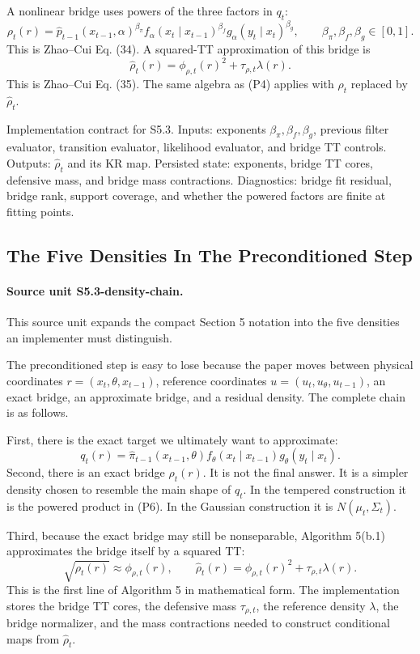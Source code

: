 \documentclass[11pt]{article}
\begin{document}
A nonlinear bridge uses powers of the three factors in \(q_t\):
\[
    \rho_t(r)
    =
    \widehat p_{t-1}(x_{t-1},\alpha)^{\beta_\pi}
    f_\alpha(x_t\mid x_{t-1})^{\beta_f}
    g_\alpha(y_t\mid x_t)^{\beta_g},
    \qquad
    \beta_\pi,\beta_f,\beta_g\in[0,1].
    \tag{P6}
\]
This is Zhao--Cui Eq. (34).  A squared-TT approximation of this bridge is
\[
    \widehat\rho_t(r)
    =
    \phi_{\rho,t}(r)^2+\tau_{\rho,t}\lambda(r).
    \tag{P7}
\]
This is Zhao--Cui Eq. (35).  The same algebra as (P4) applies with
\(\rho_t\) replaced by \(\widehat\rho_t\).

Implementation contract for S5.3.  Inputs: exponents
\(\beta_\pi,\beta_f,\beta_g\), previous filter evaluator, transition evaluator,
likelihood evaluator, and bridge TT controls.  Outputs: \(\widehat\rho_t\) and
its KR map.  Persisted state: exponents, bridge TT cores, defensive mass, and
bridge mass contractions.  Diagnostics: bridge fit residual, bridge rank,
support coverage, and whether the powered factors are finite at fitting points.

\subsection{The Five Densities In The Preconditioned Step}

\paragraph{Source unit S5.3-density-chain.}
This source unit expands the compact Section 5 notation into the five densities
an implementer must distinguish.

The preconditioned step is easy to lose because the paper moves between
physical coordinates \(r=(x_t,\theta,x_{t-1})\), reference coordinates
\(u=(u_t,u_\theta,u_{t-1})\), an exact bridge, an approximate bridge, and a
residual density.  The complete chain is as follows.

First, there is the exact target we ultimately want to approximate:
\[
    q_t(r)
    =
    \widehat\pi_{t-1}(x_{t-1},\theta)
    f_\theta(x_t\mid x_{t-1})
    g_\theta(y_t\mid x_t).
    \tag{P7a}
\]
Second, there is an exact bridge \(\rho_t(r)\).  It is not the final answer.
It is a simpler density chosen to resemble the main shape of \(q_t\).  In the
tempered construction it is the powered product in (P6).  In the Gaussian
construction it is \(N(\mu_t,\Sigma_t)\).

Third, because the exact bridge may still be nonseparable, Algorithm 5(b.1)
approximates the bridge itself by a squared TT:
\[
    \sqrt{\rho_t(r)}\approx \phi_{\rho,t}(r),
    \qquad
    \widehat\rho_t(r)
    =
    \phi_{\rho,t}(r)^2+\tau_{\rho,t}\lambda(r).
    \tag{P7b}
\]
This is the first line of Algorithm 5 in mathematical form.  The implementation
stores the bridge TT cores, the defensive mass \(\tau_{\rho,t}\), the reference
density \(\lambda\), the bridge normalizer, and the mass contractions needed to
construct conditional maps from \(\widehat\rho_t\).
\end{document}
